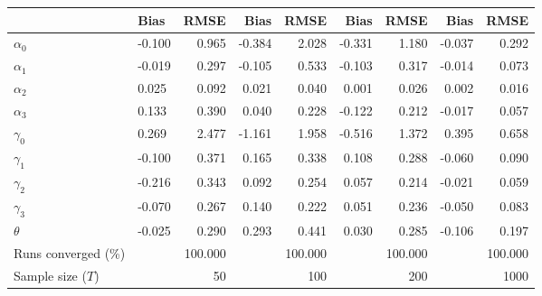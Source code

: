 
\begin{tabular}[t]{llrrrrrrr}
\toprule
  & Bias & RMSE & Bias & RMSE & Bias & RMSE & Bias & RMSE\\
\midrule
$\alpha_{0}$ & -0.100 & 0.965 & -0.384 & 2.028 & -0.331 & 1.180 & -0.037 & 0.292\\
$\alpha_{1}$ & -0.019 & 0.297 & -0.105 & 0.533 & -0.103 & 0.317 & -0.014 & 0.073\\
$\alpha_{2}$ & 0.025 & 0.092 & 0.021 & 0.040 & 0.001 & 0.026 & 0.002 & 0.016\\
$\alpha_{3}$ & 0.133 & 0.390 & 0.040 & 0.228 & -0.122 & 0.212 & -0.017 & 0.057\\
$\gamma_{0}$ & 0.269 & 2.477 & -1.161 & 1.958 & -0.516 & 1.372 & 0.395 & 0.658\\
$\gamma_{1}$ & -0.100 & 0.371 & 0.165 & 0.338 & 0.108 & 0.288 & -0.060 & 0.090\\
$\gamma_{2}$ & -0.216 & 0.343 & 0.092 & 0.254 & 0.057 & 0.214 & -0.021 & 0.059\\
$\gamma_{3}$ & -0.070 & 0.267 & 0.140 & 0.222 & 0.051 & 0.236 & -0.050 & 0.083\\
$\theta$ & -0.025 & 0.290 & 0.293 & 0.441 & 0.030 & 0.285 & -0.106 & 0.197\\
Runs converged (\%) &  & 100.000 &  & 100.000 &  & 100.000 &  & 100.000\\
Sample size ($T$) &  & 50 &  & 100 &  & 200 &  & 1000\\
\bottomrule
\end{tabular}
